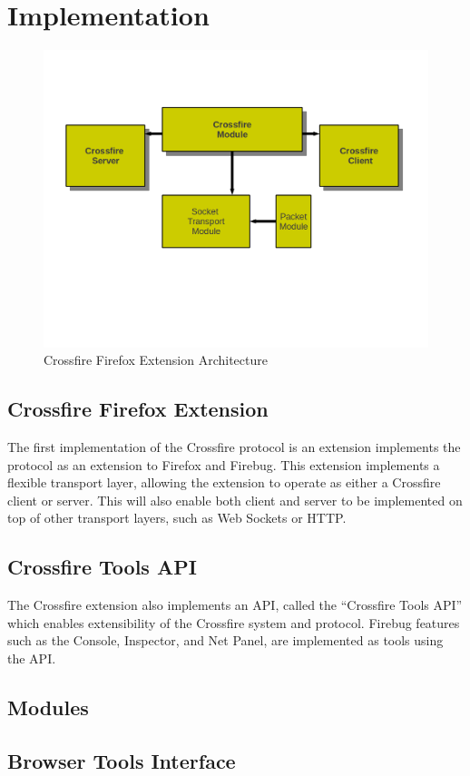 \section{Implementation}

\begin{figure}
  \includegraphics  [width = 86 mm] {figures/crossfire-arch4.png}
  \caption{Crossfire Firefox Extension Architecture}
 \label{fig:crossfire-arch}
\end{figure}

\subsection{Crossfire Firefox Extension}
The first implementation of the Crossfire protocol is an extension implements
the protocol as an extension to Firefox and Firebug. This extension implements a
flexible transport layer, allowing the extension to operate as either a
Crossfire client or server. This will also enable both client and server to be
implemented on top of other transport layers, such as Web Sockets or HTTP.



\subsection{Crossfire Tools API}
The Crossfire extension also implements an API, called the ``Crossfire Tools API''
which enables extensibility of the Crossfire system and protocol. Firebug
features such as the Console, Inspector, and Net Panel, are implemented as tools
using the API.

\subsection{Modules}

\subsection {Browser Tools Interface}